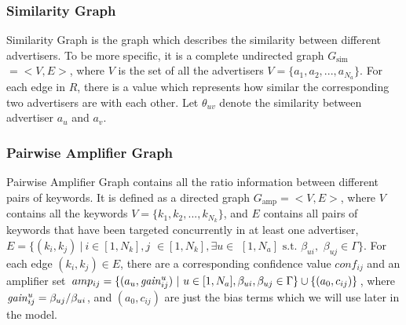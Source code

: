 \subsubsection{Similarity Graph}
\label{sec:simi_graph}
Similarity Graph is the graph which describes the similarity between
different advertisers. To be more specific, it is a complete
undirected graph $G_{\mbox{sim}}$ $=<V,E>$, where $V$ is the set of
all the advertisers $V=\{a_1,a_2,...,a_{N_a}\}$. For each edge in $R$,
there is a value which represents how similar the corresponding two
advertisers are with each other. Let $\theta_{uv}$ denote the
similarity between advertiser $a_u$ and $a_v$.

\subsubsection{Pairwise Amplifier Graph}
\label{sec:pag}
Pairwise Amplifier Graph contains all the ratio information between
different pairs of keywords. It is defined as a directed graph
$G_{\mbox{amp}}=<V,E>$, where $V$ contains all the keywords
$V=\{k_1,k_2,...,k_{N_k}\}$, and $E$ contains all pairs of keywords
that have been targeted concurrently in at least one advertiser,
$E=\{(k_i,k_j)~|~i\in [1,N_k],j$ $\in [1,N_k],\exists u\in $ $
[1,N_a]\mbox{ s.t. }\beta_{ui},$ $\beta_{uj}\in \Gamma\}$. For each
edge $(k_i,k_j)\in E$, there are a corresponding confidence value
$conf_{ij}$ and an amplifier set $amp_{ij}=\{(a_u,\mathit{gain}^{u}_{ij})~|~u\in
[1,N_a],\beta_{ui},\beta_{uj}\in \Gamma\} \cup \{(a_0,c_{ij})\}$,
where $\mathit{gain}^{u}_{ij}=\beta_{uj}/\beta_{ui}$, and $(a_0,c_{ij})$ are
just the bias terms which we will use later in the model.

